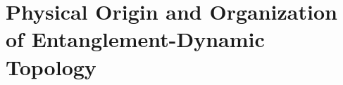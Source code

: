 \documentclass[twocolumn,10pt]{article}
\begin{document}




\section*{Physical Origin and Organization of Entanglement-Dynamic Topology}

\end{document}
